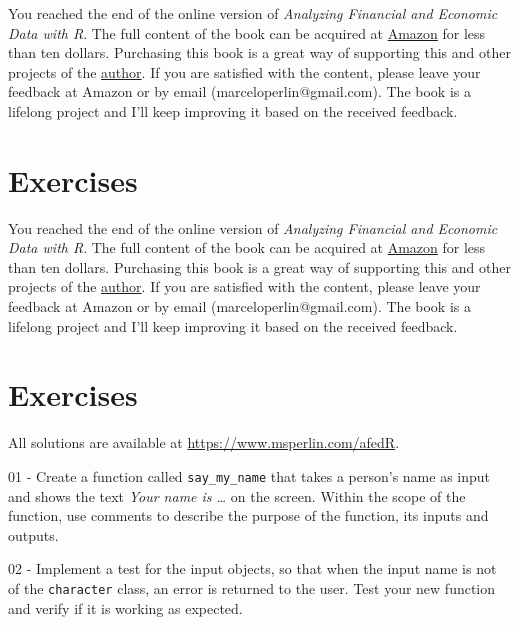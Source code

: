 \documentclass[
  12pt,
]{book}
\newenvironment{pleasebuyit}
{\begin{noteblock}
		
	} {\end{noteblock}}
\begin{document}
\begin{pleasebuyit}
You reached the end of the online version of \emph{Analyzing Financial
and Economic Data with R}. The full content of the book can be acquired
at \href{https://www.amazon.com/dp/B084LSNXMN}{Amazon} for less than ten
dollars. Purchasing this book is a great way of supporting this and
other projects of the \href{https://www.msperlin.com/}{author}. If you
are satisfied with the content, please leave your feedback at Amazon or
by email (marceloperlin@gmail.com). The book is a lifelong project and
I'll keep improving it based on the received feedback.
\end{pleasebuyit}

\hypertarget{exercises-5}{%
\section{Exercises}\label{exercises-5}}

\begin{pleasebuyit}
You reached the end of the online version of \emph{Analyzing Financial
and Economic Data with R}. The full content of the book can be acquired
at \href{https://www.amazon.com/dp/B084LSNXMN}{Amazon} for less than ten
dollars. Purchasing this book is a great way of supporting this and
other projects of the \href{https://www.msperlin.com/}{author}. If you
are satisfied with the content, please leave your feedback at Amazon or
by email (marceloperlin@gmail.com). The book is a lifelong project and
I'll keep improving it based on the received feedback.
\end{pleasebuyit}

\hypertarget{exercises-6}{%
\section{Exercises}\label{exercises-6}}

All solutions are available at \url{https://www.msperlin.com/afedR}.

01 -
Create a function called \texttt{say\_my\_name} that takes a person's name as input and shows the text \emph{Your name is \ldots{}} on the screen. Within the scope of the function, use comments to describe the purpose of the function, its inputs and outputs.

02 -
Implement a test for the input objects, so that when the input name is not of the \texttt{character} class, an error is returned to the user. Test your new function and verify if it is working as expected.
\end{document}
